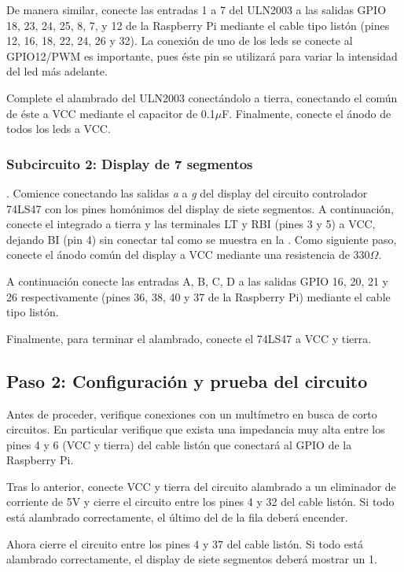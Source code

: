 \documentclass[letterpaper,10.5pt]{article}
\begin{document}
De manera similar, conecte las entradas 1 a 7 del ULN2003 a las salidas GPIO 18, 23, 24, 25, 8, 7, y 12 de la Raspberry Pi mediante el cable tipo listón (pines 12, 16, 18, 22, 24, 26 y 32).
La conexión de uno de los leds se conecte al GPIO12/PWM es importante, pues éste pin se utilizará para variar la intensidad del led más adelante.

Complete el alambrado del ULN2003 conectándolo a tierra, conectando el común de éste a VCC mediante el capacitor de 0.1$\mu$F. Finalmente, conecte el ánodo de todos los leds a VCC.%

\subsubsection{Subcircuito 2: Display de 7 segmentos}.
Comience conectando las salidas \emph{a} a \emph{g} del display del circuito controlador 74LS47 con los pines homónimos del display de siete segmentos.
A continuación, conecte el integrado a tierra y las terminales LT y RBI (pines 3 y 5) a VCC, dejando BI (pin 4) sin conectar tal como se muestra en la .
Como siguiente paso, conecte el ánodo común del display a VCC mediante una resistencia de 330$\Omega$.

A continuación conecte las entradas A, B, C, D a las salidas GPIO 16, 20, 21 y 26 respectivamente (pines 36, 38, 40 y 37 de la Raspberry Pi) mediante el cable tipo listón.

Finalmente, para terminar el alambrado, conecte el 74LS47 a VCC y tierra.

%
%
\subsection{Paso 2: Configuración y prueba del circuito}%
\label{sec:step2}
Antes de proceder, verifique conexiones con un multímetro en busca de corto circuitos. En particular verifique que exista una impedancia muy alta entre los pines 4 y 6 (VCC y tierra) del cable listón que conectará al GPIO de la Raspberry Pi.

Tras lo anterior, conecte VCC y tierra del circuito alambrado a un eliminador de corriente de 5V y cierre el circuito entre los pines 4 y 32 del cable listón. Si todo está alambrado correctamente, el último del de la fila deberá encender.

Ahora cierre el circuito entre los pines 4 y 37 del cable listón. Si todo está alambrado correctamente, el display de siete segmentos deberá mostrar un 1.
\end{document}
